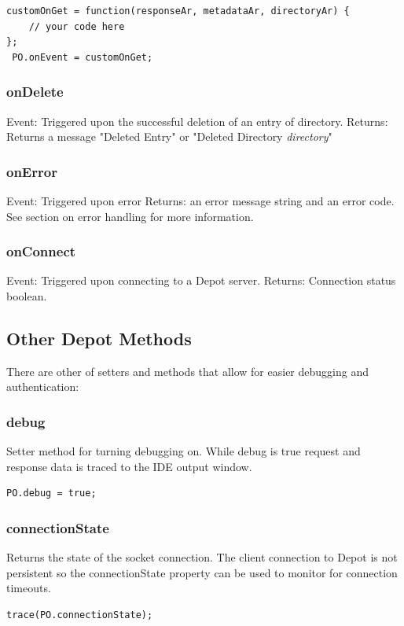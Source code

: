 \documentclass{report}
\begin{document}
\begin{Verbatim}[frame=single]
 customOnGet = function(responseAr, metadataAr, directoryAr) {
	// your code here
};
 PO.onEvent = customOnGet;
\end{Verbatim}

\subsubsection{onDelete}
Event: Triggered upon the successful deletion of an entry of directory.
Returns: Returns a message "Deleted Entry" or "Deleted Directory \textit{directory}"
\subsubsection{onError}
Event: Triggered upon error
Returns: an error message string and an error code.
See section on error handling for more information.

\subsubsection{onConnect}
Event: Triggered upon connecting to a Depot server.
Returns: Connection status boolean.

\subsection{Other Depot Methods}
There are other of setters and methods that allow for easier debugging and authentication:

\subsubsection{debug}
Setter method for turning debugging on. While debug is true request and response data is traced to the IDE output window.

\begin{Verbatim}[frame=single]
 PO.debug = true;
\end{Verbatim}

\subsubsection{connectionState}
Returns the state of the socket connection. The client connection to Depot is not persistent so the connectionState property can be used to monitor for connection timeouts.

\begin{Verbatim}[frame=single]
 trace(PO.connectionState);
\end{Verbatim}
\end{document}

